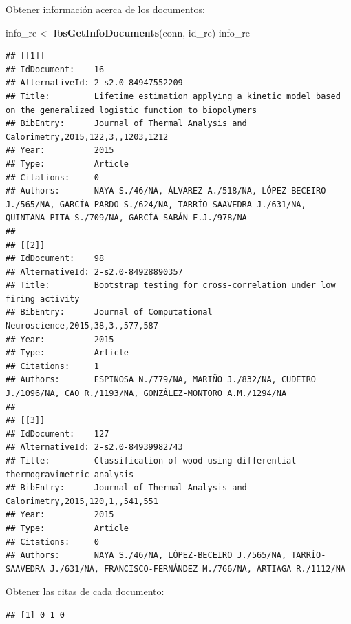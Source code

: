 \documentclass[]{book}
\newenvironment{Shaded}{\begin{snugshade}}{\end{snugshade}}
\newcommand{\KeywordTok}[1]{\textcolor[rgb]{0.13,0.29,0.53}{\textbf{#1}}}
\newcommand{\StringTok}[1]{\textcolor[rgb]{0.31,0.60,0.02}{#1}}
\newcommand{\ControlFlowTok}[1]{\textcolor[rgb]{0.13,0.29,0.53}{\textbf{#1}}}
\newcommand{\OperatorTok}[1]{\textcolor[rgb]{0.81,0.36,0.00}{\textbf{#1}}}
\newcommand{\NormalTok}[1]{#1}
\begin{document}
Obtener información acerca de los documentos:

\begin{Shaded}
\begin{Highlighting}[]
\NormalTok{info_re <-}\StringTok{ }\KeywordTok{lbsGetInfoDocuments}\NormalTok{(conn, id_re)}
\NormalTok{info_re}
\end{Highlighting}
\end{Shaded}

\begin{verbatim}
## [[1]]
## IdDocument:    16
## AlternativeId: 2-s2.0-84947552209
## Title:         Lifetime estimation applying a kinetic model based on the generalized logistic function to biopolymers
## BibEntry:      Journal of Thermal Analysis and Calorimetry,2015,122,3,,1203,1212
## Year:          2015
## Type:          Article
## Citations:     0
## Authors:       NAYA S./46/NA, ÁLVAREZ A./518/NA, LÓPEZ-BECEIRO J./565/NA, GARCÍA-PARDO S./624/NA, TARRÍO-SAAVEDRA J./631/NA, QUINTANA-PITA S./709/NA, GARCÍA-SABÁN F.J./978/NA
## 
## [[2]]
## IdDocument:    98
## AlternativeId: 2-s2.0-84928890357
## Title:         Bootstrap testing for cross-correlation under low firing activity
## BibEntry:      Journal of Computational Neuroscience,2015,38,3,,577,587
## Year:          2015
## Type:          Article
## Citations:     1
## Authors:       ESPINOSA N./779/NA, MARIÑO J./832/NA, CUDEIRO J./1096/NA, CAO R./1193/NA, GONZÁLEZ-MONTORO A.M./1294/NA
## 
## [[3]]
## IdDocument:    127
## AlternativeId: 2-s2.0-84939982743
## Title:         Classification of wood using differential thermogravimetric analysis
## BibEntry:      Journal of Thermal Analysis and Calorimetry,2015,120,1,,541,551
## Year:          2015
## Type:          Article
## Citations:     0
## Authors:       NAYA S./46/NA, LÓPEZ-BECEIRO J./565/NA, TARRÍO-SAAVEDRA J./631/NA, FRANCISCO-FERNÁNDEZ M./766/NA, ARTIAGA R./1112/NA
\end{verbatim}

Obtener las citas de cada documento:

\begin{Shaded}
\end{Shaded}

\begin{verbatim}
## [1] 0 1 0
\end{verbatim}
\end{document}

